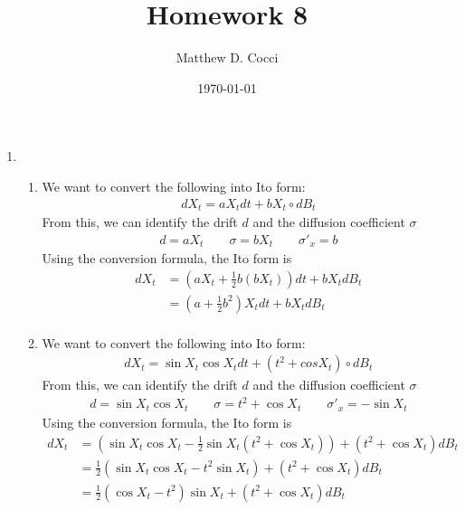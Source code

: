 \documentclass[12pt]{article}
\author{Matthew D. Cocci}
\title{Homework 8}
\date{\today}
\theoremstyle{plain}
\theoremstyle{definition}
\theoremstyle{remark}
\begin{document}
\maketitle



\begin{enumerate}
  \item %
    \begin{enumerate}
      \item %
        We want to convert the following into Ito form:
        \begin{align*}
          dX_t = aX_t dt + b X_t \circ dB_t
        \end{align*}
        From this, we can identify the drift $d$ and the diffusion
        coefficient $\sigma$
        \begin{align*}
          d = aX_t \qquad
          \sigma = bX_t \qquad
          \sigma'_x = b
        \end{align*}
        Using the conversion formula, the Ito form is
        \begin{align*}
          dX_t
            &= \left( aX_t + \frac{1}{2} b (bX_t) \right) dt
          + bX_t dB_t \\
          &= \left( a + \frac{1}{2} b^2 \right) X_t dt
            + bX_t dB_t \\
        \end{align*}

      \item %
        We want to convert the following into Ito form:
        \begin{align*}
          dX_t = \sin X_t \cos X_t dt + (t^2 + cos X_t) \circ dB_t
        \end{align*}
        From this, we can identify the drift $d$ and the diffusion
        coefficient $\sigma$
        \begin{align*}
          d = \sin X_t \cos X_t \qquad
          \sigma = t^2 + \cos X_t \qquad
          \sigma'_x = -\sin X_t
        \end{align*}
        Using the conversion formula, the Ito form is
        \begin{align*}
          dX_t
            &= \left( \sin X_t \cos X_t
            - \frac{1}{2} \sin X_t (t^2 + \cos X_t)\right)
            + (t^2+\cos X_t) dB_t \\
            &= \frac{1}{2} \left( \sin X_t \cos X_t
            - t^2 \sin X_t \right)
            + (t^2+\cos X_t) dB_t \\
            &= \frac{1}{2} \left( \cos X_t
            - t^2  \right) \sin X_t
            + (t^2+\cos X_t) dB_t \\
        \end{align*}


\end{enumerate}
\end{enumerate}
\end{document}
